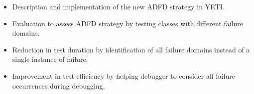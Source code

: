 \begin{itemize}
\item Description and implementation of the new ADFD strategy in YETI.
\item Evaluation to assess ADFD strategy by testing classes with different failure domains.
\item Reduction in test duration by identification of all failure domains instead of a single instance of failure.
\item Improvement in test efficiency by helping debugger to consider all failure occurrences during debugging. 
\end{itemize}








